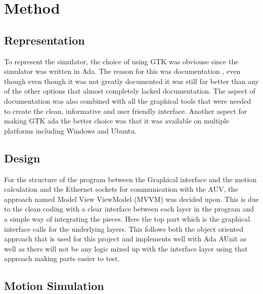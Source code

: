\section{Method}\label{sec:method}

\subsection{Representation}

To represent the simulator, the choice of using GTK was obviouse since the simulator was written in Ada. The reason for this was documentation , even though even though it was not greatly documented it was still far better than any of the other options that almost completely lacked documentation. The aspect of documentation was also combined with all the graphical tools that were needed to create the clean, informative and user friendly interface. Another aspect for making GTK ada the better choice was that it was available on multiple platforms including Windows and Ubuntu.
\subsection{Design}

For the structure of the program between the Graphical interface and the motion calculation and the Ethernet sockets for communication with the AUV, the approach named Model View ViewModel (MVVM) was decided upon. This is due to the clean coding with a clear interface between each layer in the program and a simple way of integrating the pieces. Here the top part which is the graphical interface calls for the underlying layers. This follows both the object oriented approach that is used for this project and implements well with Ada AUnit as well as there will not be any logic mixed up with the interface layer using that approach making parts easier to test.
\subsection{Motion Simulation}

